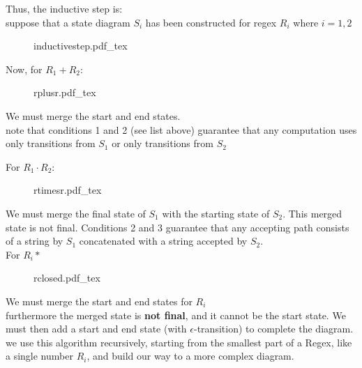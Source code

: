 \documentclass[12pt]{book}
\newcommand{\incfig}[1]{%
    {#1.pdf_tex}
}
\begin{document}
Thus, the inductive step is:\\
suppose that a state diagram $S_i$ has been constructed for regex  $R_i$ where  $i=1,2$

\begin{figure}[ht]
        \centering
        \incfig{inductivestep}
        \centering
\end{figure}

Now, for $R_1 + R_2$:
\begin{figure}[h]
        \centering
        \incfig{rplusr}
\end{figure}

We must merge the start and end states.\\
note that conditions 1 and 2 (see list above) guarantee that any computation uses only transitions from $S_1$
        or only transitions from $S_2$
\pagebreak

For $R_1\cdot R_2$:

\begin{figure}[ht]
        \centering
        \incfig{rtimesr}
\end{figure}

We must merge the final state of $S_1$ with the starting state of $S_2$. 
This merged state is not final.
Conditions 2 and 3 guarantee that any accepting path consists of a string by $S_1$ concatenated with 
        a string accepted by $S_2$.\\

For $R_i*$   

\begin{figure}[h]
        \centering
        \incfig{rclosed}
\end{figure}

We must merge the start and end states for $R_i$\\
        furthermore the merged state is \textbf{not final}, and it cannot be the start state.
We must then add a start and end state (with $\epsilon$-transition) to complete the diagram.\\
we use this algorithm recursively, starting from the smallest part of a Regex, like a single number $R_i$, and build our way to
        a more complex diagram.
\end{document}
